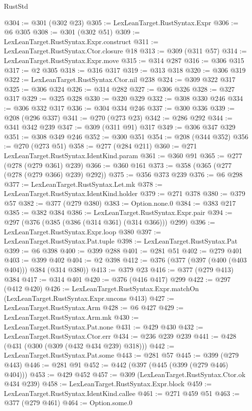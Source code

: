 \begin{lexlean}{RustStd}
\begin{coremodule}
@304 := @301 (@302 @23)
@305 := LexLeanTarget.RustSyntax.Expr
@306 := @6 @305
@308 := @301 (@302 @51)
@309 := LexLeanTarget.RustSyntax.Expr.construct
@311 := LexLeanTarget.RustSyntax.Ctor.closure @18
@313 := @309 (@311 @57)
@314 := LexLeanTarget.RustSyntax.Expr.move
@315 := @314 @287
@316 := @306 @315
@317 := @2 @305
@318 := @316 @317
@319 := @313 @318
@320 := @306 @319
@322 := LexLeanTarget.RustSyntax.Ctor.nil @238
@324 := @309 @322 @317
@325 := @306 @324
@326 := @314 @282
@327 := @306 @326
@328 := @327 @317
@329 := @325 @328
@330 := @320 @329
@332 := @308 @330 @246
@334 := @306 @332 @317
@336 := @304 @334 @246
@337 := @300 @336
@339 := @208 (@296 @337)
@341 := @270 (@273 @23)
@342 := @286 @292
@344 := @341 @342 @239
@347 := @309 (@311 @91) @317
@349 := @306 @347 @329
@351 := @308 @349 @246
@352 := @300 @351
@354 := @208 (@344 @352)
@356 := @270 (@273 @51)
@358 := @277 (@284 @211)
@360 := @271 LexLeanTarget.RustSyntax.IdentKind.param
@361 := @360 @91
@365 := @277 (@278 (@279 @361) @239)
@366 := @360 @161
@373 := @358 (@365 (@277 (@278 (@279 @366) @239) @292))
@375 := @356 @373 @239
@376 := @6 @298
@377 := LexLeanTarget.RustSyntax.Let.mk
@378 := LexLeanTarget.RustSyntax.IdentKind.holder
@379 := @271 @378
@380 := @379 @57
@382 := @377 (@279 @380)
@383 := Option.none.{0}
@384 := @383 @217
@385 := @382 @384
@386 := LexLeanTarget.RustSyntax.Expr.pair
@394 := @297 (@376 (@385 (@386 (@314 @361) (@314 @366))) @299)
@396 := LexLeanTarget.RustSyntax.Expr.loop @380
@397 := LexLeanTarget.RustSyntax.Pat.tuple
@398 := LexLeanTarget.RustSyntax.Pat
@399 := @6 @398
@400 := @399 @288
@401 := @281 @51
@402 := @279 @401
@403 := @399 @402
@404 := @2 @398
@412 := @376 (@377 (@397 (@400 (@403 @404))) @384 (@314 @380))
@413 := @379 @23
@416 := @377 (@279 @413) @384
@417 := @314 @401
@420 := @376 (@416 @417) @299
@422 := @297 (@412 @420)
@426 := LexLeanTarget.RustSyntax.Expr.matchOn (LexLeanTarget.RustSyntax.Expr.uncons @413)
@427 := LexLeanTarget.RustSyntax.Arm
@428 := @6 @427
@429 := LexLeanTarget.RustSyntax.Arm.mk
@430 := LexLeanTarget.RustSyntax.Pat.none
@431 := @429 @430
@432 := LexLeanTarget.RustSyntax.Ctor.err
@434 := @236 @239 @239
@441 := @428 (@431 (@300 (@309 (@432 @434 @239) @318)))
@442 := LexLeanTarget.RustSyntax.Pat.some
@443 := @281 @57
@445 := @399 (@279 @443)
@446 := @281 @91
@452 := @442 (@397 (@445 (@399 (@279 @446) @404)))
@453 := @429 @452
@457 := @309 (LexLeanTarget.RustSyntax.Ctor.ok @434 @239)
@458 := LexLeanTarget.RustSyntax.Expr.block
@459 := LexLeanTarget.RustSyntax.IdentKind.callee
@461 := @271 @459 @51
@463 := @377 (@279 @461)
@464 := Option.some.{0}

\end{coremodule}
\end{lexlean}
